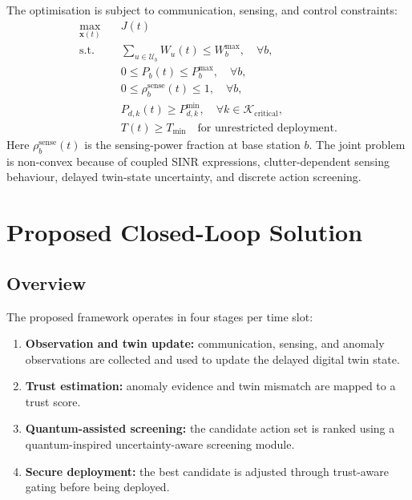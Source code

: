 \documentclass[10pt,journal]{IEEEtran}
\begin{document}
The optimisation is subject to communication, sensing, and control constraints:
\begin{subequations}
\begin{align}
\max_{\mathbf{x}(t)} \quad & J(t) \\
\text{s.t.}\quad
& \sum_{u\in\mathcal{U}_b} W_u(t) \leq W_b^{\max}, \quad \forall b, \\
& 0 \leq P_b(t) \leq P_b^{\max}, \quad \forall b, \\
& 0 \leq \rho_b^{\mathrm{sense}}(t) \leq 1, \quad \forall b, \\
& P_{d,k}(t)\geq P_{d,k}^{\min}, \quad \forall k \in \mathcal{K}_{\mathrm{critical}},\\
& T(t)\geq T_{\min} \quad \text{for unrestricted deployment}.
\end{align}
\end{subequations}
Here \(\rho_b^{\mathrm{sense}}(t)\) is the sensing-power fraction at base station \(b\). The joint problem is non-convex because of coupled SINR expressions, clutter-dependent sensing behaviour, delayed twin-state uncertainty, and discrete action screening.

\section{Proposed Closed-Loop Solution}
\label{sec:method}

\subsection{Overview}
The proposed framework operates in four stages per time slot:
\begin{enumerate}
    \item \textbf{Observation and twin update:} communication, sensing, and anomaly observations are collected and used to update the delayed digital twin state.
    \item \textbf{Trust estimation:} anomaly evidence and twin mismatch are mapped to a trust score.
    \item \textbf{Quantum-assisted screening:} the candidate action set is ranked using a quantum-inspired uncertainty-aware screening module.
    \item \textbf{Secure deployment:} the best candidate is adjusted through trust-aware gating before being deployed.
\end{enumerate}
\end{document}
